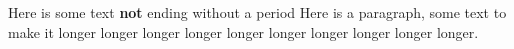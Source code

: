 Here is some text \textbf{not} ending without a period Here is a paragraph,
some text to make it longer longer longer longer longer longer longer longer
longer longer.
